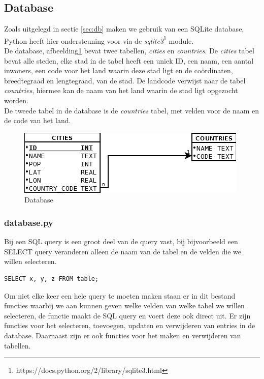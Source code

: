 \documentclass[twoside,openright]{uva-bachelor-thesis}
\begin{document}
		\subsection{Database}
			Zoals uitgelegd in sectie \ref{sec:db} maken we gebruik van een SQLite database, Python heeft hier ondersteuning voor via de \textit{sqlite3}\footnote{https://docs.python.org/2/library/sqlite3.html} module.\\[0.5cm]
			De database, afbeelding\ref{fig:db} bevat twee tabellen, \textit{cities} en \textit{countries}. De \textit{cities} tabel bevat alle steden, elke stad in de tabel heeft een uniek ID, een naam, een aantal inwoners, een code voor het land waarin deze stad ligt en de co\"ordinaten, breedtegraad en lengtegraad, van de stad. De landcode verwijst naar de tabel \textit{countries}, hiermee kan de naam van het land waarin de stad ligt opgezocht worden. \\[0.5cm]
			De tweede tabel in de database is de \textit{countries} tabel,  met velden voor de naam en de code van het land.
			\begin{figure}[!htb]
				\label{fig:db}
				\centering
				\includegraphics[scale=0.6]{./img/database.png}
				\caption{Database}
			\end{figure}
			\subsubsection{database.py}
			Bij een SQL query is een groot deel van de query vast, bij bijvoorbeeld een SELECT query veranderen alleen de naam van de tabel en de velden die we willen selecteren.
\begin{verbatim}
SELECT x, y, z FROM table;
\end{verbatim}
			Om niet elke keer een hele query te moeten maken staan er in dit bestand functies waarbij we aan kunnen geven welke velden van welke tabel we willen selecteren, de functie maakt de SQL query en voert deze ook direct uit. Er zijn functies voor het selecteren, toevoegen, updaten en verwijderen van entries in de database. Daarnaast zijn er ook functies voor het maken en verwijderen van tabellen.
\end{document}
